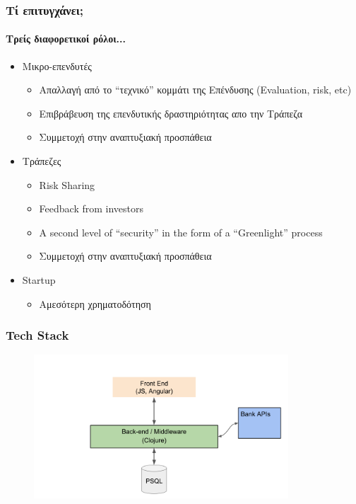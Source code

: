 \documentclass[xetex,mathserif,serif]{beamer}
\begin{document}
\begin{frame}
  \frametitle{Τί επιτυγχάνει;}
  \framesubtitle{Τρείς διαφορετικοί ρόλοι...}

\begin{itemize}
\item Μικρο-επενδυτές
  \begin{itemize}
  \item Απαλλαγή από το ``τεχνικό'' κομμάτι της Επένδυσης (Evaluation, risk, etc)
  \item Επιβράβευση της επενδυτικής δραστηριότητας απο την Τράπεζα
  \item Συμμετοχή στην αναπτυξιακή προσπάθεια
  \end{itemize}

\item Τράπεζες
  \begin{itemize}
  \item Risk Sharing
  \item Feedback from investors
  \item A second level of ``security'' in the form of a ``Greenlight''
    process
  \item Συμμετοχή στην αναπτυξιακή προσπάθεια
  \end{itemize}
    
\item Startup
  \begin{itemize}
  \item Αμεσότερη χρηματοδότηση
  \end{itemize}
\end{itemize}
  
\end{frame}


\begin{frame}
  \frametitle{Tech Stack}
  \begin{figure}
    \centering
    \includegraphics[width=0.85\textwidth]{hack-techflow.png}
  \end{figure}
\end{frame}


\end{document}
